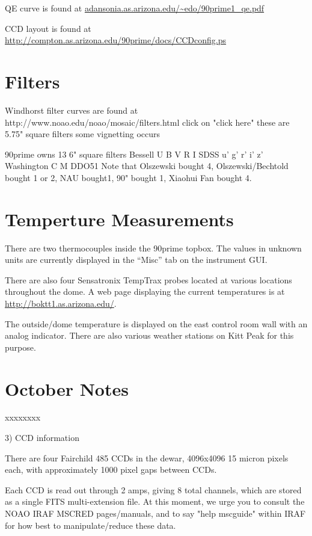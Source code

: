 \documentclass[letterpaper,12pt]{article}
\begin{document}
QE curve is found at
\url{adansonia.as.arizona.edu/~edo/90prime1_qe.pdf}

CCD layout is found at
\url{http://compton.as.arizona.edu/90prime/docs/CCDconfig.ps}

\section{Filters}

Windhorst filter curves are found at
http://www.noao.edu/noao/mosaic/filters.html
click on "click here"
these are 5.75" square filters
some vignetting occurs

90prime owns 13 6" square filters
Bessell U B V R I
SDSS u' g' r' i' z'
Washington C M DDO51
Note that Olszewski bought 4, Olszewski/Bechtold bought
1 or 2, NAU bought1, 90" bought 1, Xiaohui Fan bought 4.

\section{Temperture Measurements}

There are two thermocouples inside the 90prime topbox.  The values in
unknown units are currently displayed in the ``Misc'' tab on the 
instrument GUI.

There are also four Sensatronix TempTrax probes located at various 
locations throughout the dome.  A web page displaying the current 
temperatures is at \url{http://boktt1.as.arizona.edu/}.

The outside/dome temperature is displayed on the east control room wall
with an analog indicator.  There are also various weather stations
on Kitt Peak for this purpose.

\section{October Notes}


xxxxxxxx

3) CCD information

There are four Fairchild 485 CCDs in the dewar, 4096x4096 15 micron
pixels each, with approximately 1000 pixel gaps between CCDs.

Each CCD is read out through 2 amps, giving 8 total channels,
which are stored as a single FITS multi-extension file.
At this moment, we urge you to consult the NOAO IRAF MSCRED
pages/manuals, and to say "help mscguide" within IRAF
for how best to manipulate/reduce these data.
\end{document}
